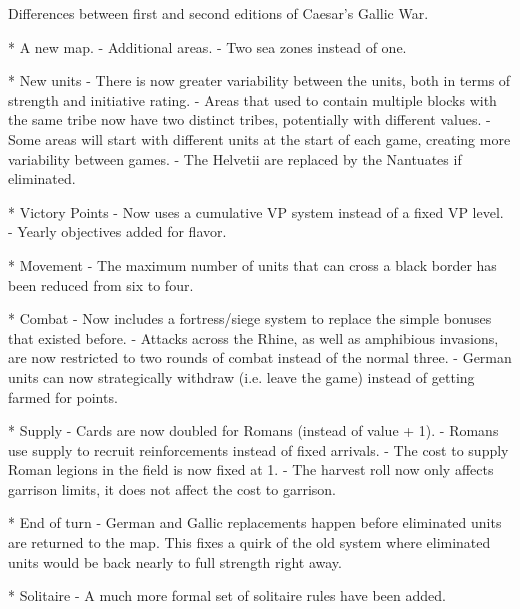 Differences between first and second editions of Caesar's Gallic War.

* A new map.
  - Additional areas.
  - Two sea zones instead of one.
  
* New units
  - There is now greater variability between the units, both in terms of strength and initiative rating.
  - Areas that used to contain multiple blocks with the same tribe now have two distinct tribes, potentially with different values.
  - Some areas will start with different units at the start of each game, creating more variability between games.
  - The Helvetii are replaced by the Nantuates if eliminated. 
  
* Victory Points
  - Now uses a cumulative VP system instead of a fixed VP level.
  - Yearly objectives added for flavor.
  
* Movement
  - The maximum number of units that can cross a black border has been reduced from six to four.
  
* Combat
  - Now includes a fortress/siege system to replace the simple bonuses that existed before.
  - Attacks across the Rhine, as well as amphibious invasions, are now restricted to two rounds of combat instead of the normal three.
  - German units can now strategically withdraw (i.e. leave the game) instead of getting farmed for points.
  
* Supply
  - Cards are now doubled for Romans (instead of value + 1).
  - Romans use supply to recruit reinforcements instead of fixed arrivals.
  - The cost to supply Roman legions in the field is now fixed at 1.
  - The harvest roll now only affects garrison limits, it does not affect the cost to garrison.
  
* End of turn
  - German and Gallic replacements happen before eliminated units are returned to the map. This fixes a quirk of the old system where eliminated units would be back nearly to full strength right away.
  
* Solitaire
  - A much more formal set of solitaire rules have been added.